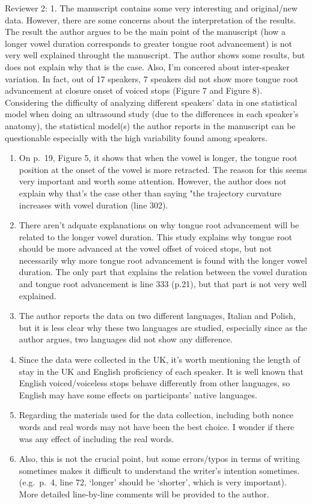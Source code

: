 \documentclass[]{article}
\begin{document}
Reviewer 2: 1. The manuscript contains some very interesting and
original/new data. However, there are some concerns about the
interpretation of the results. The result the author argues to be the
main point of the manuscript (how a longer vowel duration corresponds to
greater tongue root advancement) is not very well explained throught the
manuscript. The author shows some results, but does not explain why that
is the case. Also, I'm concered about inter-speaker variation. In fact,
out of 17 speakers, 7 speakers did not show more tongue root advancement
at closure onset of voiced stops (Figure 7 and Figure 8). Considering
the difficulty of analyzing different speakers' data in one statistical
model when doing an ultrasound study (due to the differences in each
speaker's anatomy), the statistical model(s) the author reports in the
manuscript can be questionable especially with the high variability
found among speakers.

\begin{enumerate}
\def\labelenumi{\arabic{enumi}.}
\setcounter{enumi}{1}
\item
  On p.~19, Figure 5, it shows that when the vowel is longer, the tongue
  root position at the onset of the vowel is more retracted. The reason
  for this seems very important and worth some attention. However, the
  author does not explain why that's the case other than saying "the
  trajectory curvature increases with vowel duration (line 302).
\item
  There aren't adquate explanations on why tongue root advancement will
  be related to the longer vowel duration. This study explains why
  tongue root should be more advanced at the vowel offset of voiced
  stops, but not necessarily why more tongue root advancement is found
  with the longer vowel duration. The only part that explains the
  relation between the vowel duration and tongue root advancement is
  line 333 (p.21), but that part is not very well explained.
\item
  The author reports the data on two different languages, Italian and
  Polish, but it is less clear why these two languages are studied,
  especially since as the author argues, two languages did not show any
  difference.
\item
  Since the data were collected in the UK, it's worth mentioning the
  length of stay in the UK and English proficiency of each speaker. It
  is well known that English voiced/voiceless stops behave differently
  from other languages, so English may have some effects on
  participants' native languages.
\item
  Regarding the materials used for the data collection, including both
  nonce words and real words may not have been the best choice. I wonder
  if there was any effect of including the real words.
\item
  Also, this is not the crucial point, but some errors/typos in terms of
  writing sometimes makes it difficult to understand the writer's
  intention sometimes. (e.g.~p.~4, line 72, `longer' should be
  `shorter', which is very important). More detailed line-by-line
  comments will be provided to the author.
\end{enumerate}
\end{document}

